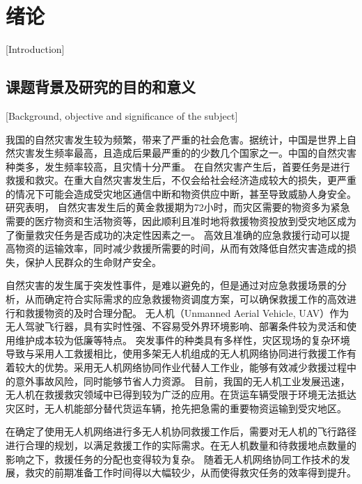 
\chapter{绪论}[Introduction]

\section{课题背景及研究的目的和意义}[Background, objective and significance of the subject]

我国的自然灾害发生较为频繁，带来了严重的社会危害。据统计，中国是世界上自然灾害发生频率最高，且造成后果最严重的的少数几个国家之一\cite{ziranzaihaifangzhide}。中国的自然灾害种类多，发生频率较高，且灾情十分严重。
在自然灾害产生后，首要任务是进行救援和救灾。在重大自然灾害发生后，不仅会给社会经济造成较大的损失，更严重的情况下可能会造成受灾地区通信中断和物资供应中断，甚至导致威胁人身安全。研究表明，
自然灾害发生后的黄金救援期为72小时，而灾区需要的物资多为紧急需要的医疗物资和生活物资等，因此顺利且准时地将救援物资投放到受灾地区成为了衡量救灾任务是否成功的决定性因素之一\cite{yuqingqing}。
高效且准确的应急救援行动可以提高物资的运输效率，同时减少救援所需要的时间，从而有效降低自然灾害造成的损失，保护人民群众的生命财产安全。


自然灾害的发生属于突发性事件，是难以避免的，但是通过对应急救援场景的分析，从而确定符合实际需求的应急救援物资调度方案，可以确保救援工作的高效进行和救援物资的及时合理分配。
无人机（Unmanned Aerial Vehicle, UAV）作为无人驾驶飞行器，具有实时性强、不容易受外界环境影响、部署条件较为灵活和使用维护成本较为低廉等特点。
突发事件的种类具有多样性，灾区现场的复杂环境导致与采用人工救援相比，使用多架无人机组成的无人机网络协同进行救援工作有着较大的优势。采用无人机网络协同作业代替人工作业，能够有效减少救援过程中的意外事故风险，同时能够节省人力资源。
目前，我国的无人机工业发展迅速，无人机在救援救灾领域中已得到较为广泛的应用。在货运车辆受限于环境无法抵达灾区时，无人机能部分替代货运车辆，抢先把急需的重要物资运输到受灾地区\cite{liuyajing}。


在确定了使用无人机网络进行多无人机协同救援工作后，需要对无人机的飞行路径进行合理的规划，以满足救援工作的实际需求。在无人机数量和待救援地点数量的影响之下，救援任务的分配也变得较为复杂。
随着无人机网络协同工作技术的发展，救灾的前期准备工作时间得以大幅较少，从而使得救灾任务的效率得到提升。


